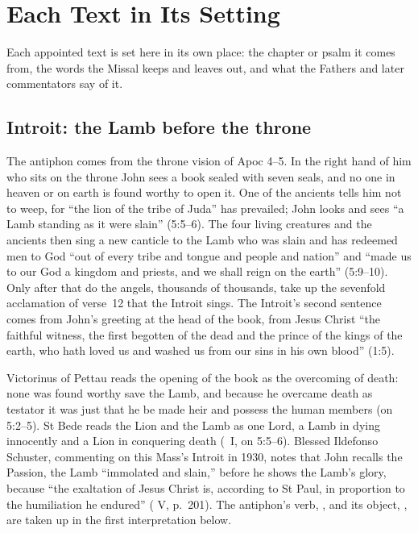 \section{Each Text in Its Setting}
\label{sec:each-element}

Each appointed text is set here in its own place: the chapter or psalm it
comes from, the words the Missal keeps and leaves out, and what the Fathers and
later commentators say of it.

\subsection{Introit: the Lamb before the throne}
\label{sec:element-introit}

The antiphon comes from the throne vision of Apoc 4--5. In the right hand of
him who sits on the throne John sees a book sealed with seven seals, and no one
in heaven or on earth is found worthy to open it. One of the ancients tells him
not to weep, for ``the lion of the tribe of Juda'' has prevailed; John looks
and sees ``a Lamb standing as it were slain'' (5:5--6). The four living
creatures and the ancients then sing a new canticle to the Lamb who was slain
and has redeemed men to God ``out of every tribe and tongue and people and
nation'' and ``made us to our God a kingdom and priests, and we shall reign on
the earth'' (5:9--10). Only after that do the angels, thousands of thousands,
take up the sevenfold acclamation of verse~12 that the Introit sings. The
Introit's second sentence comes from John's greeting at the head of the book,
from Jesus Christ ``the faithful witness, the first begotten of the dead and
the prince of the kings of the earth, who hath loved us and washed us from our
sins in his own blood'' (1:5).

Victorinus of Pettau reads the opening of the book as the overcoming of death:
none was found worthy save the Lamb, and because he overcame death as
testator it was just that he be made heir and possess the human members (on
5:2--5). St Bede reads the Lion and the Lamb as one Lord, a Lamb in dying
innocently and a Lion in conquering death (\ I, on 5:5--6).
Blessed Ildefonso Schuster, commenting on this Mass's Introit in 1930, notes
that John recalls the Passion, the Lamb ``immolated and slain,'' before he
shows the Lamb's glory, because ``the exaltation of Jesus Christ is, according
to St Paul, in proportion to the humiliation he endured'' ( V, p.~201). The antiphon's verb, , and its
object, , are taken up in the first interpretation below.

